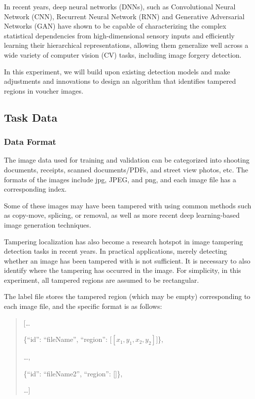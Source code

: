 In recent years, deep neural networks (DNNs), such as Convolutional Neural Network (CNN), Recurrent Neural Network (RNN) and Generative Adversarial Networks (GAN) have shown to be capable of characterizing the complex statistical dependencies from high-dimensional sensory inputs and efficiently learning their hierarchical representations, allowing them generalize well across a wide variety of computer vision (CV) tasks, including image forgery detection.\cite{8977568, article}

In this experiment, we will build upon existing detection models and make adjustments and innovations to design an algorithm that identifies tampered regions in voucher images.

\subsection{Task Data}

\subsubsection{Data Format}

The image data used for training and validation can be categorized into shooting documents, receipts, scanned documents/PDFs, and street view photos, etc. The formats of the images include jpg, JPEG, and png, and each image file has a corresponding index.

Some of these images may have been tampered with using common methods such as copy-move, splicing, or removal, as well as more recent deep learning-based image generation techniques.

Tampering localization has also become a research hotspot in image tampering detection tasks in recent years. In practical applications, merely detecting whether an image has been tampered with is not sufficient. It is necessary to also identify where the tampering has occurred in the image.\cite{18512} For simplicity, in this experiment, all tampered regions are assumed to be rectangular.

The label file stores the tampered region (which may be empty) corresponding to each image file, and the specific format is as follows:
\begin{quote}
  [\dots

  \{``id'': ``fileName'', ``region'': [$[x_1, y_1, x_2, y_2]$]\},

  \dots,

  \{``id'': ``fileName2'', ``region'': []\},

  \dots]
\end{quote}

